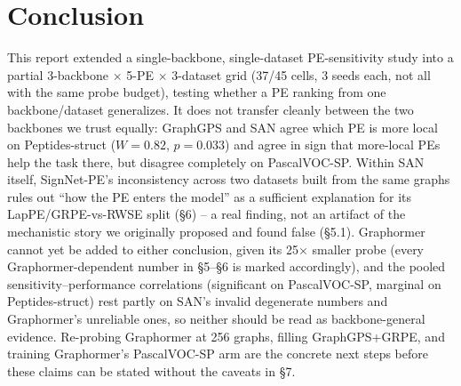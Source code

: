 \documentclass[10pt]{article}
\begin{document}
\section{Conclusion}
This report extended a single-backbone, single-dataset PE-sensitivity study into a partial 3-backbone $\times$ 5-PE $\times$ 3-dataset grid (37/45 cells, 3 seeds each, not all with the same probe budget), testing whether a PE ranking from one backbone/dataset generalizes. It does not transfer cleanly between the two backbones we trust equally: GraphGPS and SAN agree which PE is more local on Peptides-struct ($W{=}0.82$, $p{=}0.033$) and agree in sign that more-local PEs help the task there, but disagree completely on PascalVOC-SP. Within SAN itself, SignNet-PE's inconsistency across two datasets built from the same graphs rules out ``how the PE enters the model'' as a sufficient explanation for its LapPE/GRPE-vs-RWSE split (\S6) -- a real finding, not an artifact of the mechanistic story we originally proposed and found false (\S5.1). Graphormer cannot yet be added to either conclusion, given its 25$\times$ smaller probe (every Graphormer-dependent number in \S5--\S6 is marked accordingly), and the pooled sensitivity--performance correlations (significant on PascalVOC-SP, marginal on Peptides-struct) rest partly on SAN's invalid degenerate numbers and Graphormer's unreliable ones, so neither should be read as backbone-general evidence. Re-probing Graphormer at 256 graphs, filling GraphGPS+GRPE, and training Graphormer's PascalVOC-SP arm are the concrete next steps before these claims can be stated without the caveats in \S7.
\end{document}
